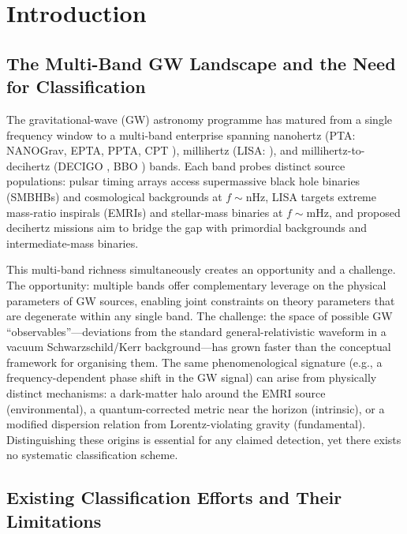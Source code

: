 \documentclass[11pt]{article}
\begin{document}
\tableofcontents

\section{Introduction}\label{sec:intro}

\subsection{The Multi-Band GW Landscape and the Need for Classification}

The gravitational-wave (GW) astronomy programme has matured from a single frequency window to a multi-band enterprise spanning nanohertz (PTA: NANOGrav, EPTA, PPTA, CPT \cite{Agazie:2023,Reardon:2023}), millihertz (LISA: \cite{AmaroSeoane:2017}), and millihertz-to-decihertz (DECIGO \cite{Kawamura:2020}, BBO \cite{Bao:2018}) bands. Each band probes distinct source populations: pulsar timing arrays access supermassive black hole binaries (SMBHBs) and cosmological backgrounds at $f \sim \text{nHz}$, LISA targets extreme mass-ratio inspirals (EMRIs) and stellar-mass binaries at $f \sim \text{mHz}$, and proposed decihertz missions aim to bridge the gap with primordial backgrounds and intermediate-mass binaries.

This multi-band richness simultaneously creates an opportunity and a challenge. The opportunity: multiple bands offer complementary leverage on the physical parameters of GW sources, enabling joint constraints on theory parameters that are degenerate within any single band. The challenge: the space of possible GW ``observables''---deviations from the standard general-relativistic waveform in a vacuum Schwarzschild/Kerr background---has grown faster than the conceptual framework for organising them. The same phenomenological signature (e.g., a frequency-dependent phase shift in the GW signal) can arise from physically distinct mechanisms: a dark-matter halo around the EMRI source (environmental), a quantum-corrected metric near the horizon (intrinsic), or a modified dispersion relation from Lorentz-violating gravity (fundamental). Distinguishing these origins is essential for any claimed detection, yet there exists no systematic classification scheme.

\subsection{Existing Classification Efforts and Their Limitations}
\end{document}
